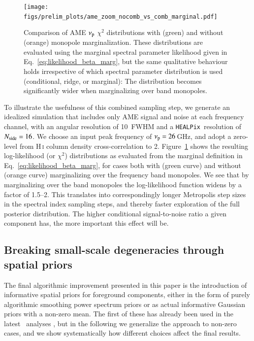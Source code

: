 \documentclass[twocolumn]{aa}
\def\healpix{\texttt{HEALPix}}
\begin{document}
\begin{figure}[t]
  \center
  \texttt{[image: figs/prelim\_plots/ame\_zoom\_nocomb\_vs\_comb\_marginal.pdf]}
  \caption{Comparison of AME $\nup$ $\chi^2$ distributions with
    (green) and without (orange) monopole marginalization. These
    distributions are evaluated using the marginal spectral parameter
    likelihood given in Eq.~\eqref{eq:likelihood_beta_marg}, but the
    same qualitative behaviour holds irrespective of which spectral
    parameter distribution is used (conditional, ridge, or marginal):
    The distribution becomes significantly wider when marginalizing
    over band monopoles.  }
  \label{fig:combined_sampler}
\end{figure}

To illustrate the usefulness of this combined sampling step, we
generate an idealized simulation that includes only AME signal and
noise at each frequency channel, with an angular resolution of
10\deg\ FWHM and a \healpix\ resolution of $\nside=16$. We choose an
input peak frequency of $\nup=26$\,GHz, and adopt a zero-level from
H\,\textsc i column density cross-correlation to
2\muKRJ. Figure~\ref{fig:combined_sampler} shows the resulting
log-likelihood (or $\chi^2$) distributions as evaluated from the
marginal definition in Eq.~\eqref{eq:likelihood_beta_marg}, for cases
both with (green curve) and without (orange curve) marginalizing over
the frequency band monopoles. We see that by marginalizing over the
band monopoles the log-likelihood function widens by a factor of
1.5--2. This translates into correspondingly longer Metropolis step
sizes in the spectral index sampling steps, and thereby faster
exploration of the full posterior distribution. The higher conditional
signal-to-noise ratio a given component has, the more important this
effect will be.



\subsection{Breaking small-scale degeneracies through spatial priors} %
\label{subsec:amplitude_priors}

The final algorithmic improvement presented in this paper is the
introduction of informative spatial priors for foreground components,
either in the form of purely algorithmic smoothing power spectrum
priors or as actual informative Gaussian priors with a non-zero
mean. The first of these has already been used in the latest
\Planck\ analyses \citep{planck2016-l04,npipe}, but in the following
we generalize the approach to non-zero cases, and we show
systematically how different choices affect the final results.
\end{document}
